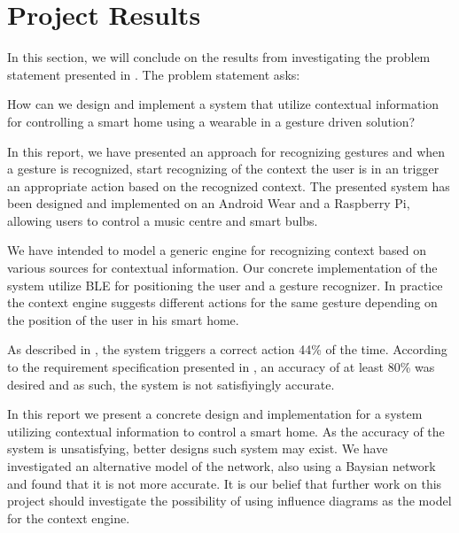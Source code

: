 \section{Project Results}
\label{sec:results}

In this section, we will conclude on the results from investigating the problem statement presented in . The problem statement asks:

\begin{framed}
\noindent How can we design and implement a system that utilize contextual information for controlling a smart home using a wearable in a gesture driven solution?
\end{framed}

In this report, we have presented an approach for recognizing gestures and when a gesture is recognized, start recognizing of the context the user is in an trigger an appropriate action based on the recognized context. The presented system has been designed and implemented on an Android Wear and a Raspberry Pi, allowing users to control a music centre and smart bulbs.

We have intended to model a generic engine for recognizing context based on various sources for contextual information. Our concrete implementation of the system utilize BLE for positioning the user and a gesture recognizer. In practice the context engine suggests different actions for the same gesture depending on the position of the user in his smart home.

As described in , the system triggers a correct action 44\% of the time. According to the requirement specification presented in , an accuracy of at least 80\% was desired and as such, the system is not satisfiyingly accurate.

In this report we present a concrete design and implementation for a system utilizing contextual information to control a smart home. As the accuracy of the system is unsatisfying, better designs such system may exist. We have investigated an alternative model of the network, also using a Baysian network and found that it is not more accurate. It is our belief that further work on this project should investigate the possibility of using influence diagrams as the model for the context engine.

